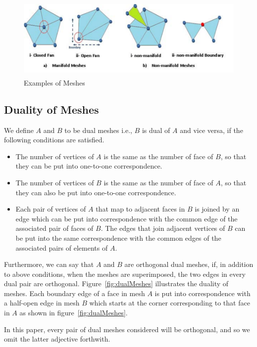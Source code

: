 \documentclass{InsightArticle}
\begin{document}
\begin{figure}[!t]
	\centering
	\includegraphics[width=155mm, height=40mm]{Meshes}
	\caption{Examples of Meshes}
	\label{fig:meshes}
\end{figure}

\subsection{Duality of Meshes}

We define $A$ and $B$ to be dual meshes i.e., $B$ is dual of $A$ and vice versa, if the following conditions are satisfied.

\begin{itemize}
	\item The number of vertices of $A$ is the same as the number of face of $B$, so that they can be put into one-to-one correspondence.
	\item The number of vertices of $B$ is the same as the number of face of $A$, so that they can also be put into one-to-one correspondence.
	\item Each pair of vertices of $A$ that map to adjacent faces in $B$ is joined by an edge which can be put into correspondence with the common edge of the associated pair of faces of $B$. The edges that join adjacent vertices of $B$ can be put into the same correspondence with the common edges of the associated pairs of elements of $A$. 
\end{itemize}

Furthermore, we can say that $A$ and $B$ are orthogonal dual meshes, if, in addition to above conditions, when the meshes are superimposed, the two edges in every dual pair are orthogonal. Figure~\ref{fig:dualMeshes} illustrates the duality of meshes. Each boundary edge of a face in mesh $A$ is put into correspondence with a half-open edge in mesh $B$ which starts at the corner corresponding to that face in $A$ as shown in figure~\ref{fig:dualMeshes}.

In this paper, every pair of dual meshes considered will be orthogonal, and so we omit the latter adjective forthwith.
\end{document}
